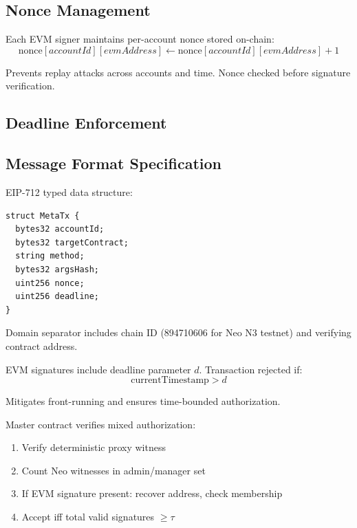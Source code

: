 \documentclass[10pt,twocolumn]{article}
\begin{document}
\subsection{Nonce Management}

Each EVM signer maintains per-account nonce stored on-chain:
$$\text{nonce}[accountId][evmAddress] \gets \text{nonce}[accountId][evmAddress] + 1$$

Prevents replay attacks across accounts and time. Nonce checked before signature verification.

\subsection{Deadline Enforcement}

\subsection{Message Format Specification}

EIP-712 typed data structure:
\begin{verbatim}
struct MetaTx {
  bytes32 accountId;
  bytes32 targetContract;
  string method;
  bytes32 argsHash;
  uint256 nonce;
  uint256 deadline;
}
\end{verbatim}

Domain separator includes chain ID (894710606 for Neo N3 testnet) and verifying contract address.


EVM signatures include deadline parameter $d$. Transaction rejected if:
$$\text{currentTimestamp} > d$$

Mitigates front-running and ensures time-bounded authorization.


Master contract verifies mixed authorization:
\begin{enumerate}[leftmargin=*,topsep=2pt,itemsep=1pt]
\item Verify deterministic proxy witness
\item Count Neo witnesses in admin/manager set
\item If EVM signature present: recover address, check membership
\item Accept iff total valid signatures $\geq \tau$
\end{enumerate}
\end{document}

